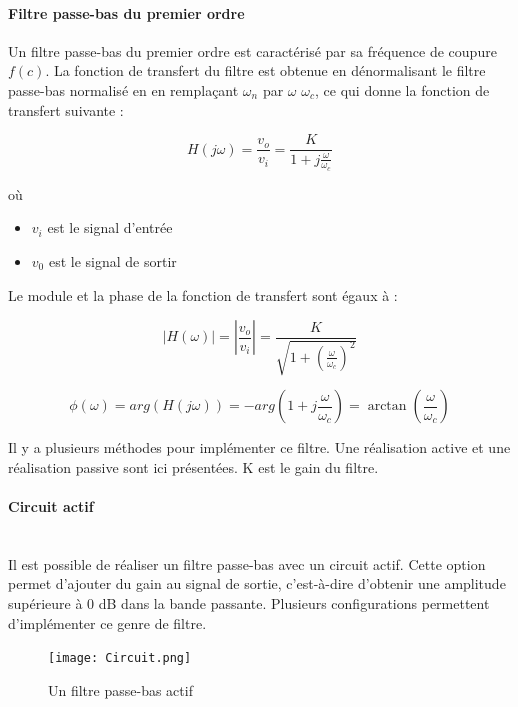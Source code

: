 \documentclass[conference,onecolumn]{IEEEtran}
\begin{document}
\paragraph{Filtre passe-bas du premier ordre}
Un filtre passe-bas du premier ordre est caractérisé par sa fréquence de coupure $f(c)$.  La fonction de transfert du filtre est obtenue en dénormalisant le filtre passe-bas normalisé en en remplaçant $\omega_n$ par $\omega$ $\omega_c$,
ce qui donne la fonction de transfert suivante :

\begin{equation}
    H(j\omega)= \frac{v_o}{v_i} = \frac{K}{1+j\frac{\omega}{\omega_c}}
\end{equation}

où
\begin{itemize}
    \item[] $v_i$ est le signal d'entrée
    \item[] $v_0$ est le signal de sortir
\end{itemize}


Le module et la phase de la fonction de transfert sont égaux à :

\begin{equation}
    |H(\omega)|=|\frac{v_o}{v_i}|= \frac{K}{\sqrt{1 + (\frac{\omega}{\omega_c})^2}}
\end{equation}

\begin{equation}
    \phi(\omega) = arg(H(j\omega)) = -arg(1 + j\frac{\omega}{\omega_c}) = \arctan(\frac{\omega}{\omega_c})
\end{equation}

Il y a plusieurs méthodes pour implémenter ce filtre. Une réalisation active et une réalisation passive sont ici présentées. K est le gain du filtre.

\paragraph{Circuit actif}
\hfill\\
Il est  possible de réaliser un filtre passe-bas avec un circuit actif. Cette option permet d'ajouter du gain au signal de sortie, c'est-à-dire d'obtenir une amplitude supérieure à 0 dB dans la bande passante. Plusieurs configurations permettent d'implémenter ce genre de filtre.

 \begin{figure}[H]
 \centering
    \texttt{[image: Circuit.png]}
    \caption{Un filtre passe-bas actif}
\end{figure}
\end{document}
